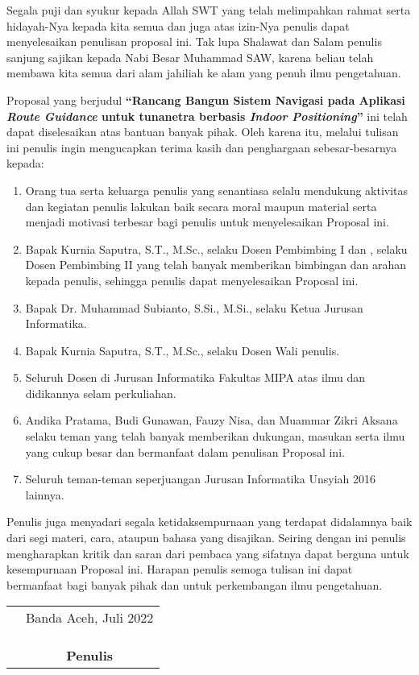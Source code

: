 \preface %


Segala puji dan syukur kepada Allah SWT yang telah melimpahkan rahmat serta hidayah-Nya kepada kita semua dan juga atas izin-Nya penulis dapat menyelesaikan penulisan proposal ini. Tak lupa Shalawat dan Salam penulis sanjung sajikan kepada Nabi Besar Muhammad SAW, karena beliau telah membawa kita semua dari alam jahiliah ke alam yang penuh ilmu pengetahuan.

Proposal yang berjudul \textbf{“Rancang Bangun Sistem Navigasi pada Aplikasi \textit{Route Guidance} untuk tunanetra berbasis \textit{Indoor Positioning}”} ini telah dapat diselesaikan atas bantuan banyak pihak. Oleh karena itu, melalui tulisan ini penulis ingin mengucapkan terima kasih dan penghargaan sebesar-besarnya kepada:

\begin{enumerate}
	\item {Orang tua serta keluarga penulis yang senantiasa selalu mendukung aktivitas dan kegiatan penulis lakukan baik secara moral maupun material serta menjadi motivasi terbesar bagi penulis untuk menyelesaikan Proposal ini.}
	\item {Bapak Kurnia Saputra, S.T., M.Sc., selaku Dosen Pembimbing I dan , selaku Dosen Pembimbing II yang telah banyak memberikan bimbingan dan arahan kepada penulis, sehingga penulis dapat menyelesaikan Proposal ini.}
	\item {Bapak Dr. Muhammad Subianto, S.Si., M.Si., selaku Ketua Jurusan Informatika.}
	\item {Bapak Kurnia Saputra, S.T., M.Sc., selaku Dosen Wali penulis.}
	\item {Seluruh Dosen di Jurusan Informatika Fakultas MIPA atas ilmu dan didikannya selam perkuliahan.}
	\item {Andika Pratama, Budi Gunawan, Fauzy Nisa, dan Muammar Zikri Aksana selaku teman yang telah banyak memberikan dukungan, masukan serta ilmu yang cukup besar dan bermanfaat dalam penulisan Proposal ini. }
	\item{Seluruh teman-teman seperjuangan Jurusan Informatika Unsyiah 2016 lainnya.}
\end{enumerate}


Penulis juga menyadari segala ketidaksempurnaan yang terdapat didalamnya baik dari segi materi, cara, ataupun bahasa yang disajikan. Seiring dengan ini penulis mengharapkan kritik dan saran dari pembaca yang sifatnya dapat berguna untuk kesempurnaan Proposal ini. Harapan penulis semoga tulisan ini dapat bermanfaat bagi banyak pihak dan untuk perkembangan ilmu pengetahuan.

\vspace{1cm}


\begin{tabular}{p{7.5cm}c}
	&Banda Aceh, Juli 2022\\
	&\\
	&\\
	&\\
	&\textbf{Penulis}
\end{tabular}